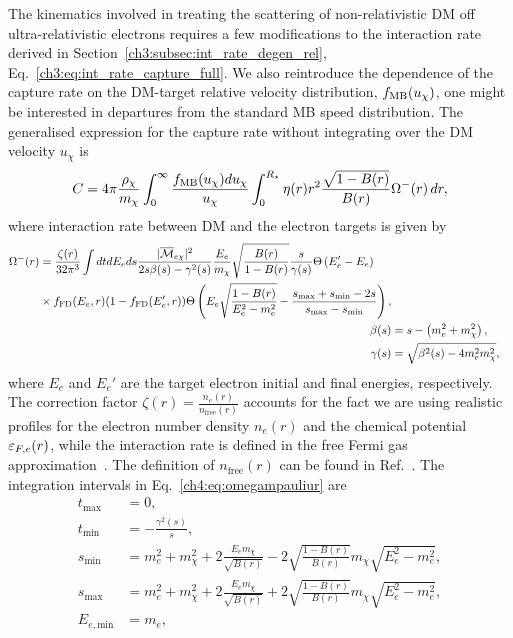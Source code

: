 The kinematics involved in treating the scattering of non-relativistic DM off ultra-relativistic electrons requires a few modifications to the interaction rate derived in Section~\ref{ch3:subsec:int_rate_degen_rel}, Eq.~\ref{ch3:eq:int_rate_capture_full}.
We also reintroduce the dependence of the capture rate on the DM-target relative velocity distribution, $f_{\rm MB}(u_\chi)$, one might be interested in departures from the standard MB speed distribution. The generalised expression for the capture rate without integrating over the DM velocity $u_\chi$ is 
\begin{equation}
C = 4\pi \frac{\rho_\chi}{m_\chi} \int_0^\infty \frac{f_{\rm MB}(u_\chi)du_\chi}{u_\chi}
\int_0^{R_\star} \eta(r) r^2 \frac{\sqrt{1-B(r)}}{B(r)} \Omega^{-}(r)  \, dr,     \label{ch4:eq:capturelec}
\end{equation}
where interaction rate between DM and the electron targets is given by~\cite{Bell:2020jou_sep_ImprovedTreatmentDark,Bell:2020lmm_mar_ImprovedTreatmentDark} 
\small
\begin{align}
    \begin{split}
        \Omega^{-}(r) &= \frac{\zeta(r)}{32\pi^3}\int dt dE_e ds  
        \frac{|\overline{\mathcal{M}}_{e\chi}|^2}{2s\beta(s)-\gamma^2(s)}  \frac{E_e}{m_\chi}\sqrt{\frac{B(r)}{1-B(r)}} \frac{s}{\gamma(s)}\Theta\left(E_e'-E_e\right)\\
        &\times f_{\rm FD}(E_e,r)(1-f_{\rm FD}(E_e',r))\Theta\left(E_e\sqrt{\frac{1-B(r)}{E_e^2-m_e^2}}-\frac{s_\mathrm{max}+s_\mathrm{min}-2s}{s_\mathrm{max}-s_\mathrm{min}}\right),
        \label{ch4:eq:omegampauliur}
    \end{split}\\
        \beta(s) &= s-\left(m_e^2+m_\chi^2\right),\\
        \gamma(s) &= \sqrt{\beta^2(s)-4m_e^2m_\chi^2},
\end{align}
\normalsize
where $E_e$ and $E_e'$ are the target electron initial and final energies, respectively. The correction factor $\zeta(r)=\frac{n_{e}(r)}{n_\mathrm{free}(r)}$ accounts for the fact we are using realistic profiles for the electron number density $n_e(r)$ and the chemical potential $\varepsilon_{F,e}(r)$, while the interaction rate is defined in the free Fermi gas approximation~\cite{Garani:2018kkd_may_NewAnalysisNeutron,Bell:2020jou_sep_ImprovedTreatmentDark,Bell:2020obw_sep_NucleonStructureStrong}. 
The definition of $n_\mathrm{free}(r)$ can be found in Ref.~\cite{Bell:2020jou_sep_ImprovedTreatmentDark}. 
The integration intervals in Eq.~\ref{ch4:eq:omegampauliur} are
\begin{align}
t_\mathrm{max} &= 0,\\
t_\mathrm{min} &= -\frac{\gamma^2(s)}{s},\\
s_\mathrm{min} &= m_e^2+m_\chi^2 + 2\frac{E_e m_\chi}{\sqrt{B(r)}}-2\sqrt{\frac{1-B(r)}{B(r)}}m_\chi\sqrt{E_e^2-m_e^2},\label{ch4:eq:smin}\\
s_\mathrm{max} &= m_e^2+m_\chi^2 + 2\frac{E_e m_\chi}{\sqrt{B(r)}}+2\sqrt{\frac{1-B(r)}{B(r)}}m_\chi\sqrt{E_e^2-m_e^2}\label{ch4:eq:smax},\\
E_{e,\mathrm{min}} &= m_e,
\end{align}
